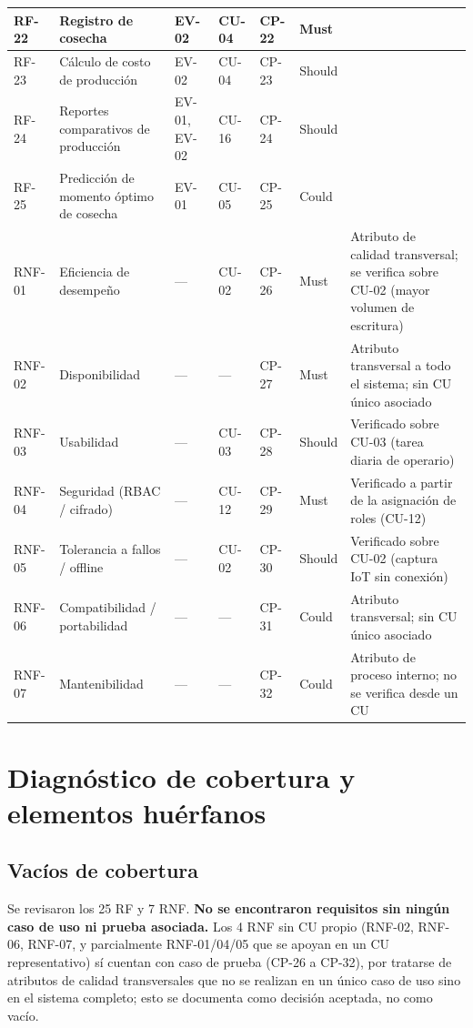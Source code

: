 \documentclass[11pt,a4paper]{article}
\begin{document}
\begin{longtable}{|p{1.4cm}|p{4.3cm}|p{1.6cm}|p{1.6cm}|p{1.6cm}|p{1cm}|p{2.7cm}|}
RF-22 & Registro de cosecha & EV-02 & CU-04 & CP-22 & Must & \\ \hline
RF-23 & Cálculo de costo de producción & EV-02 & CU-04 & CP-23 & Should & \\ \hline
RF-24 & Reportes comparativos de producción & EV-01, EV-02 & CU-16 & CP-24 & Should & \\ \hline
RF-25 & Predicción de momento óptimo de cosecha & EV-01 & CU-05 & CP-25 & Could & \\ \hline
RNF-01 & Eficiencia de desempeño & --- & CU-02 & CP-26 & Must & Atributo de calidad transversal; se verifica sobre CU-02 (mayor volumen de escritura) \\ \hline
RNF-02 & Disponibilidad & --- & --- & CP-27 & Must & Atributo transversal a todo el sistema; sin CU único asociado \\ \hline
RNF-03 & Usabilidad & --- & CU-03 & CP-28 & Should & Verificado sobre CU-03 (tarea diaria de operario) \\ \hline
RNF-04 & Seguridad (RBAC / cifrado) & --- & CU-12 & CP-29 & Must & Verificado a partir de la asignación de roles (CU-12) \\ \hline
RNF-05 & Tolerancia a fallos / offline & --- & CU-02 & CP-30 & Should & Verificado sobre CU-02 (captura IoT sin conexión) \\ \hline
RNF-06 & Compatibilidad / portabilidad & --- & --- & CP-31 & Could & Atributo transversal; sin CU único asociado \\ \hline
RNF-07 & Mantenibilidad & --- & --- & CP-32 & Could & Atributo de proceso interno; no se verifica desde un CU \\ \hline

\end{longtable}

\section{Diagnóstico de cobertura y elementos huérfanos}

\subsection{Vacíos de cobertura}
Se revisaron los 25 RF y 7 RNF. \textbf{No se encontraron requisitos sin ningún caso de uso ni prueba asociada.} Los 4 RNF sin CU propio (RNF-02, RNF-06, RNF-07, y parcialmente RNF-01/04/05 que se apoyan en un CU representativo) sí cuentan con caso de prueba (CP-26 a CP-32), por tratarse de atributos de calidad transversales que no se realizan en un único caso de uso sino en el sistema completo; esto se documenta como decisión aceptada, no como vacío.
\end{document}
